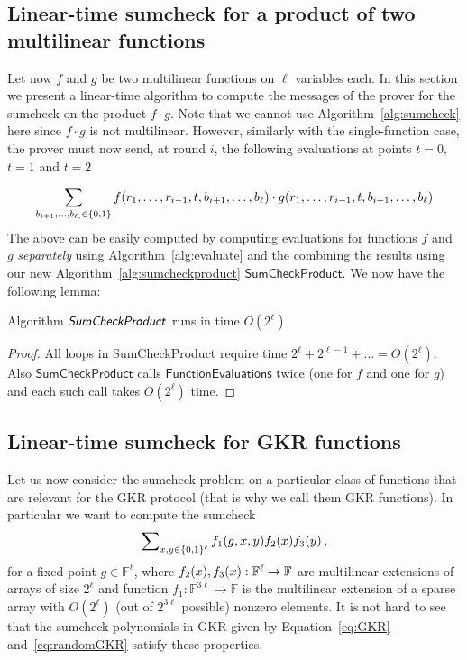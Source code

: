 \subsection{Linear-time sumcheck for a product of two multilinear functions\label{particular}}
Let now $f$ and $g$ be two multilinear functions on $\ell$ variables each. In this section we present a linear-time algorithm to compute the messages of the prover for the sumcheck on the product $f\cdot g$. Note that we cannot use Algorithm~\ref{alg:sumcheck} here since $f\cdot g$ is not multilinear. However, similarly with the single-function case, the prover must now send, at round $i$, the following evaluations at points $t = 0$, $t=1$ and $t=2$

$$\sum_{b_{i+1}, \ldots,b_{\ell, }\in\{0,1\}}f(r_1,\ldots, r_{i-1}, t, b_{i+1},\ldots, b_{\ell})\cdot g(r_1,\ldots, r_{i-1}, t, b_{i+1},\ldots, b_{\ell}) $$
The above can be easily computed by computing evaluations for functions $f$ and $g$ \emph{separately} using Algorithm~\ref{alg:evaluate} and the combining the results using our new Algorithm~\ref{alg:sumcheckproduct} $\textsf{SumCheckProduct}$. We now have the following lemma:
\begin{lemma}\label{main_lemma_complexity}
Algorithm $\textsf{\emph{SumCheckProduct}}$ runs in time $O(2^\ell)$\end{lemma}
\begin{proof}
All loops in \textsf{SumCheckProduct} require time $2^\ell+2^{\ell-1}+\ldots=O(2^\ell)$. Also $\textsf{SumCheckProduct}$ calls $\textsf{FunctionEvaluations}$ twice (one for $f$ and one for $g$) and each such call takes $O(2^\ell)$ time. \end{proof}



\subsection{Linear-time sumcheck for GKR functions}
Let us now consider the sumcheck problem on a particular class of functions that are relevant for the GKR protocol (that is why we call them GKR functions). In particular we want to compute the sumcheck 
\begin{equation}\label{eq:linearsc}
\sum\nolimits_{x,y\in\{0,1\}^\ell}f_1(g,x,y)f_2(x)f_3(y)\, ,
\end{equation}
for a fixed point $g\in\mathbb{F}^\ell$, where $f_2(x),f_3(x): \mathbb{F}^\ell\rightarrow \mathbb{F}$ are multilinear extensions of arrays of size $2^\ell$ and function $f_1:\mathbb{F}^{3\ell}\rightarrow\mathbb{F}$ is the multilinear extension of a sparse array with $O(2^\ell)$ (out of $2^{3\ell}$ possible) nonzero elements. 
It is not hard to see that the sumcheck polynomials in GKR given by Equation~\ref{eq:GKR} and~\ref{eq:randomGKR} satisfy these properties.


